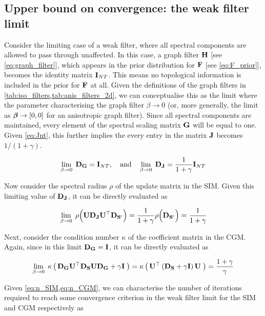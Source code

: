 \subsection{Upper bound on convergence: the weak filter limit}

\label{sec:wfl_derivation}

Consider the limiting case of a weak filter, where all spectral components are allowed to pass through unaffected. In this case, a graph filter $\mathbf{H}$ [see \cref{eq:graph_filter}], which appears in the prior distribution for $\mathbf{F}$ [see \cref{eq:F_prior}], becomes the identity matrix $\mathbf{I}_{NT}$. This means no topological information is included in the prior for $\mathbf{F}$ at all. Given the definitions of the graph filters in \cref{tab:iso_filters,tab:anis_filters_2d}, we can conceptualise this as the limit where the parameter characterising the graph filter $\beta \rightarrow 0$ (or, more generally, the limit as $\boldsymbol{\beta} \rightarrow [0, 0]$ for an anisotropic graph filter). Since all spectral components are maintained, every element of the spectral scaling matrix $\mathbf{G}$ will be equal to one. Given \cref{eq:Jnt}, this further implies the every entry in the matrix $\mathbf{J}$ becomes $1 / (1 + \gamma)$. 

$$
\lim_{\beta \rightarrow 0} \; \mathbf{D}_{\mathbf{G}} = \mathbf{I}_{NT}, \quad \text{and} \quad \lim_{\beta \rightarrow 0} \; \mathbf{D}_{\mathbf{J}} = \frac{1}{1 + \gamma} \mathbf{I}_{NT}
$$

Now consider the spectral radius $\rho$ of the update matrix in the SIM. Given this limiting value of $\mathbf{D}_{\mathbf{J}}$, it can be directly evaluated as

\begin{equation}
    \lim_{\beta \rightarrow 0} \; \rho\Big(\mathbf{U} \mathbf{D}_{\mathbf{J}} \mathbf{U}^\top \mathbf{D}_{\mathbf{S}'} \Big)
    = \frac{1}{1 + \gamma} \rho\Big(\mathbf{D}_{\mathbf{S}'} \Big)
    = \frac{1}{1 + \gamma} \label{eq:beta_lim_0} 
\end{equation}


Next, consider the condition number $\kappa$ of the coefficient matrix in the CGM. Again, since in this limit $\mathbf{D}_{\mathbf{G}} = \mathbf{I}$, it can be directly evaluated as 


\begin{equation}
    \lim_{\beta \rightarrow 0} \; \kappa \left(  \, \mathbf{D}_{\mathbf{G}} \mathbf{U}^\top \mathbf{D}_{\mathbf{S}} \mathbf{U} \mathbf{D}_{\mathbf{G}} + \gamma \mathbf{I} \; \right)
    = \kappa  \left(  \, \mathbf{U}^\top \left( \mathbf{D}_{\mathbf{S}} + \gamma \mathbf{I} \right) \mathbf{U} \; \right)
    = \frac{1 + \gamma}{\gamma}
\end{equation}

 Given \cref{eq:n_SIM,eq:n_CGM}, we can characterise the number of iterations required to reach some convergence criterion in the weak filter limit for the SIM and CGM respectively as

